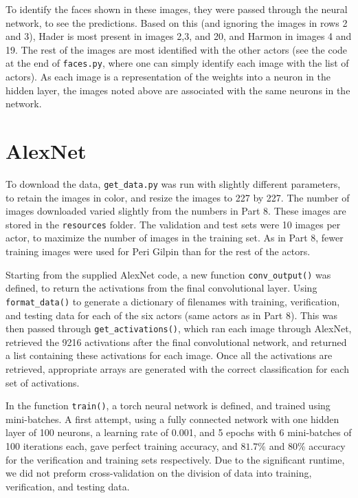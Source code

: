 \documentclass{article}
\begin{document}
   To identify the faces shown in these images, they were passed through the neural network, to see the predictions.
   Based on this (and ignoring the images in rows 2 and 3), Hader is most present in images 2,3, and 20,
   and Harmon in images 4 and 19. The rest of the images are most identified with the other actors (see
   the code at the end of \texttt{faces.py}, where one can simply identify each image with the list of actors).
   As each image is a representation of the weights into a neuron in the hidden layer, the images noted above
   are associated with the same neurons in the network.

   \section{AlexNet}
   To download the data, \texttt{get\_data.py} was run with slightly different parameters, to retain the images
   in color, and resize the images to 227 by 227. The number of images downloaded varied slightly from the numbers
   in Part 8. These images are stored in the \texttt{resources} folder.
   The validation and test sets were 10 images per actor, to maximize the number of images in the training set.
   As in Part 8, fewer training images were used for Peri Gilpin than for the rest of the actors.

   Starting from the supplied AlexNet code, a new function \texttt{conv\_output()} was defined,
   to return the activations from the final convolutional layer. Using \texttt{format\_data()} to generate
   a dictionary of filenames with training, verification, and testing data for each of the six actors (same
   actors as in Part 8). This was then passed through \texttt{get\_activations()}, which ran each image
   through AlexNet, retrieved the 9216 activations after the final convolutional network, and returned a list
   containing these activations for each image. Once all the activations are retrieved, appropriate
   arrays are generated with the correct classification for each set of activations.

   In the function \texttt{train()}, a torch neural network is defined, and trained using mini-batches.
   A first attempt, using a fully connected network with one hidden layer of 100 neurons, a learning rate of 0.001, and
   5 epochs with 6 mini-batches of 100 iterations each, gave perfect training accuracy, and $81.7\%$ and
   $80\%$ accuracy for the verification and training sets respectively.
   Due to the significant runtime, we did not preform cross-validation on the division of data into
   training, verification, and testing data.
\end{document}
